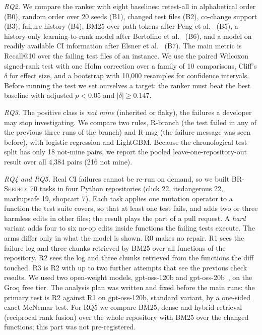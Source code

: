 \documentclass[10pt,conference]{IEEEtran}
\newcommand{\brs}{\textsc{BR-Seeded}}
\begin{document}
\textit{RQ2.} We compare the ranker with eight baselines: retest-all in alphabetical order (B0), random order over 20 seeds (B1), changed test files (B2), co-change support (B3), failure history (B4), BM25 over path tokens after Peng et al.~\cite{peng2020empirically} (B5), a history-only learning-to-rank model after Bertolino et al.~\cite{bertolino2020learning} (B6), and a model on readily available CI information after Elsner et al.~\cite{elsner2021empirically} (B7). The main metric is Recall@10 over the failing test files of an instance. We use the paired Wilcoxon signed-rank test with one Holm correction over a family of 10 comparisons, Cliff's $\delta$ for effect size, and a bootstrap with 10,000 resamples for confidence intervals. Before running the test we set ourselves a target: the ranker must beat the best baseline with adjusted $p<0.05$ and $|\delta|\geq 0.147$.

\textit{RQ3.} The positive class is \emph{not mine} (inherited or flaky), the failures a developer may stop investigating. We compare two rules, R-branch (the test failed in any of the previous three runs of the branch) and R-msg (the failure message was seen before), with logistic regression and LightGBM. Because the chronological test split has only 18 not-mine pairs, we report the pooled leave-one-repository-out result over all 4,384 pairs (216 not mine).

\textit{RQ4 and RQ5.} Real CI failures cannot be re-run on demand, so we built \brs{}: 70 tasks in four Python repositories (click 22, itsdangerous 22, markupsafe 19, shopcart 7). Each task applies one mutation operator to a function the test suite covers, so that at least one test fails, and adds two or three harmless edits in other files; the result plays the part of a pull request. A \emph{hard} variant adds four to six no-op edits inside functions the failing tests execute. The arms differ only in what the model is shown. R0 makes no repair. R1 sees the failure log and three chunks retrieved by BM25 over all functions of the repository. R2 sees the log and three chunks retrieved from the functions the diff touched. R3 is R2 with up to two further attempts that see the previous check results. We used two open-weight models, gpt-oss-120b and gpt-oss-20b~\cite{openai2025gptoss}, on the Groq free tier. The analysis plan was written and fixed before the main runs: the primary test is R2 against R1 on gpt-oss-120b, standard variant, by a one-sided exact McNemar test. For RQ5 we compare BM25, dense and hybrid retrieval (reciprocal rank fusion) over the whole repository with BM25 over the changed functions; this part was not pre-registered.
\end{document}
